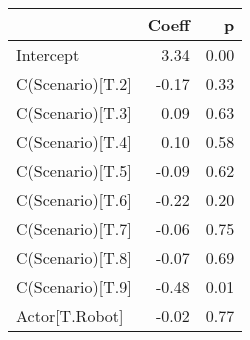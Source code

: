 \begin{tabular}{lrr}
\toprule
{} &  Coeff &    p \\
\midrule
Intercept        &   3.34 & 0.00 \\
C(Scenario)[T.2] &  -0.17 & 0.33 \\
C(Scenario)[T.3] &   0.09 & 0.63 \\
C(Scenario)[T.4] &   0.10 & 0.58 \\
C(Scenario)[T.5] &  -0.09 & 0.62 \\
C(Scenario)[T.6] &  -0.22 & 0.20 \\
C(Scenario)[T.7] &  -0.06 & 0.75 \\
C(Scenario)[T.8] &  -0.07 & 0.69 \\
C(Scenario)[T.9] &  -0.48 & 0.01 \\
Actor[T.Robot]   &  -0.02 & 0.77 \\
\bottomrule
\end{tabular}
